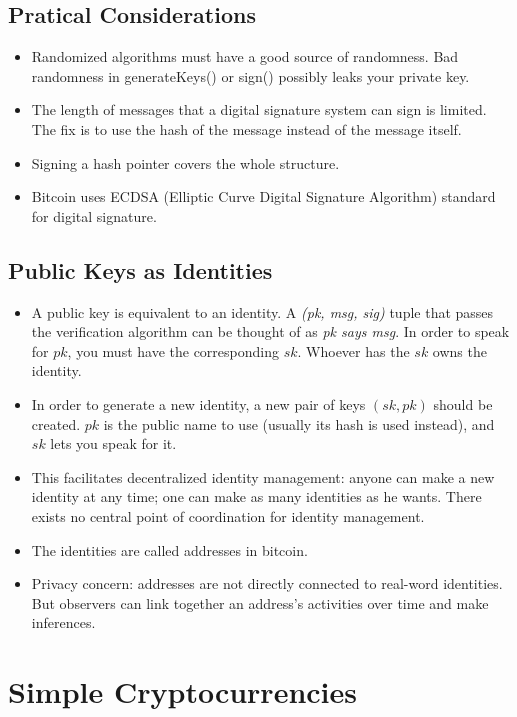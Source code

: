\subsection{Pratical Considerations}
\begin{itemize}
  \item Randomized algorithms must have a good source of randomness. Bad randomness in generateKeys() or sign() possibly leaks your private key.
  \item The length of messages that a digital signature system can sign is limited. The fix is to use the hash of the message instead of the message itself.
  \item Signing a hash pointer covers the whole structure.
  \item Bitcoin uses ECDSA (Elliptic Curve Digital Signature Algorithm) standard for digital signature.
\end{itemize}
\subsection{Public Keys as Identities}
\begin{itemize}
  \item A public key is equivalent to an identity. A \textit{(pk, msg, sig)} tuple that passes the verification algorithm can be thought of as \textit{pk says msg}. In order to speak for $pk$, you must have the corresponding $sk$. Whoever has the $sk$ owns the identity.
  \item In order to generate a new identity, a new pair of keys $(sk, pk)$ should be created. $pk$ is the public name to use (usually its hash is used instead), and $sk$ lets you speak for it.
  \item This facilitates decentralized identity management: anyone can make a new identity at any time; one can make as many identities as he wants. There exists no central point of coordination for identity management.
  \item The identities are called addresses in bitcoin.
  \item Privacy concern: addresses are not directly connected to real-word identities. But observers can link together an address's activities over time and make inferences.
\end{itemize}
\section{Simple Cryptocurrencies}
